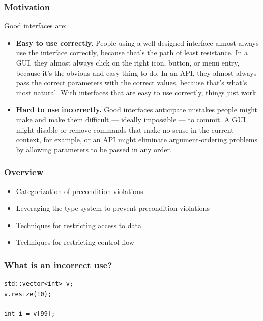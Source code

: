 \documentclass[aspectratio=169]{beamer}
\begin{document}
\begin{frame}

  \frametitle{Motivation}
  
  Good interfaces are:
  \begin{itemize}
    \item \textbf{Easy to use correctly.} People using a well-designed interface almost always use the interface correctly, because that's the path of least resistance. In a GUI, they almost always click on the right icon, button, or menu entry, because it's the obvious and easy thing to do. In an API, they almost always pass the correct parameters with the correct values, because that's what's most natural. With interfaces that are easy to use correctly, things just work.
    \item \textbf{Hard to use incorrectly.} Good interfaces anticipate mistakes people might make and make them difficult — ideally impossible — to commit. A GUI might disable or remove commands that make no sense in the current context, for example, or an API might eliminate argument-ordering problems by allowing parameters to be passed in any order.
  \end{itemize}
  

\end{frame}


\begin{frame}
  \frametitle{Overview}
  \begin{itemize}
    \item Categorization of precondition violations
    \item Leveraging the type system to prevent precondition violations
    \item Techniques for restricting access to data
    \item Techniques for restricting control flow
    \end{itemize}
\end{frame}

\begin{frame}[fragile]
  \frametitle{What is an incorrect use?}
  
  \begin{lstlisting}[style=cpp20]
std::vector<int> v;
v.resize(10);

int i = v[99];
  \end{lstlisting}
\end{frame}
\end{document}
